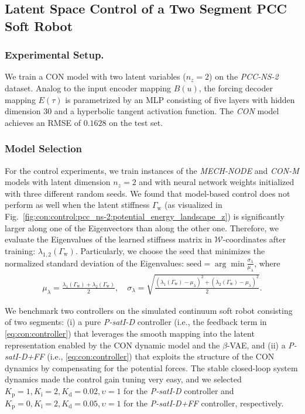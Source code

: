 \subsection{Latent Space Control of a Two Segment PCC Soft Robot}

\subsubsection{Experimental Setup.}
We train a \gls{CON} model with two latent variables ($n_z = 2$) on the \emph{PCC-NS-2} dataset.
Analog to the input encoder mapping $B(u)$, the forcing decoder mapping $E(\tau)$ is parametrized by an \gls{MLP} consisting of five layers with hidden dimension $30$ and a hyperbolic tangent activation function.
The \emph{CON} model achieves an \gls{RMSE} of $0.1628$ on the test set.
\subsubsection{Model Selection}
For the control experiments, we train instances of the \emph{MECH-NODE} and \emph{CON-M} models with latent dimension $n_z = 2$ and with neural network weights initialized with three different random seeds. 
We found that model-based control does not perform as well when the latent stiffness $\Gamma_\mathrm{w}$ (as visualized in Fig.~\ref{fig:con:control:pcc_ns-2:potential_energy_landscape_z}) is significantly larger along one of the Eigenvectors than along the other one. Therefore, we evaluate the Eigenvalues of the learned stiffness matrix in $\mathcal{W}$-coordinates after training: $\lambda_{1,2}(\Gamma_\mathrm{w})$. Particularly, we choose the seed that minimizes the normalized standard deviation of the Eigenvalues: $\mathrm{seed} = \arg\min \frac{\sigma_\lambda}{\mu_\lambda}$, where
\begin{equation}
\begin{split}
    \mu_\lambda = \frac{\lambda_1(\Gamma_\mathrm{w}) + \lambda_2(\Gamma_\mathrm{w})}{2},
    \quad
    \sigma_\lambda = \sqrt{\frac{(\lambda_1(\Gamma_\mathrm{w})-\mu_\lambda)^2 + (\lambda_2(\Gamma_\mathrm{w})-\mu_\lambda)^2}{2}}.
\end{split}
\end{equation}


We benchmark two controllers on the simulated continuum soft robot consisting of two segments: (i) a pure \emph{P-satI-D} controller (i.e., the feedback term in \eqref{eq:con:controller}) that leverages the smooth mapping into the latent representation enabled by the \gls{CON} dynamic model and the $\beta$-\gls{VAE}, and (ii) a \emph{P-satI-D+FF} (i.e., \eqref{eq:con:controller}) that exploits the structure of the \gls{CON} dynamics by compensating for the potential forces.
The stable closed-loop system dynamics made the control gain tuning very easy, and we selected $K_\mathrm{p} = 1, K_\mathrm{i}=2, K_\mathrm{d} = 0.02, \upsilon = 1$ for the \emph{P-satI-D} controller and $K_\mathrm{p} = 0, K_\mathrm{i}=2, K_\mathrm{d} = 0.05, \upsilon = 1$ for the \emph{P-satI-D+FF} controller, respectively.

